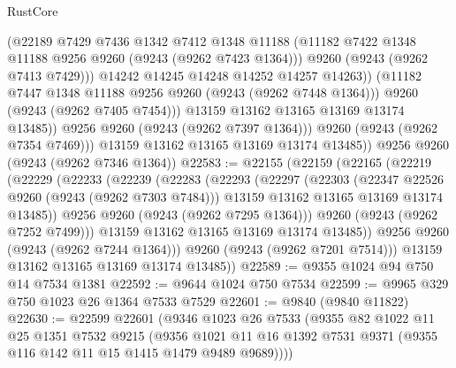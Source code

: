 \begin{lexlean}{RustCore}
\begin{coremodule}
                      (@22189
                        @7429
                        @7436
                        @1342
                        @7412
                        @1348
                        @11188
                        (@11182 @7422 @1348 @11188 @9256 @9260 (@9243 (@9262 @7423 @1364)))
                        @9260
                        (@9243 (@9262 @7413 @7429)))
                      @14242
                      @14245
                      @14248
                      @14252
                      @14257
                      @14263))
                  (@11182 @7447 @1348 @11188 @9256 @9260 (@9243 (@9262 @7448 @1364)))
                  @9260
                  (@9243 (@9262 @7405 @7454)))
                @13159
                @13162
                @13165
                @13169
                @13174
                @13485))
            @9256
            @9260
            (@9243 (@9262 @7397 @1364)))
          @9260
          (@9243 (@9262 @7354 @7469)))
        @13159
        @13162
        @13165
        @13169
        @13174
        @13485))
    @9256
    @9260
    (@9243 (@9262 @7346 @1364))
@22583 := @22155
    (@22159
      (@22165
        (@22219
          (@22229
            (@22233
              (@22239
                (@22283
                  (@22293
                    (@22297
                      (@22303
                        (@22347 @22526 @9260 (@9243 (@9262 @7303 @7484)))
                        @13159
                        @13162
                        @13165
                        @13169
                        @13174
                        @13485))
                    @9256
                    @9260
                    (@9243 (@9262 @7295 @1364)))
                  @9260
                  (@9243 (@9262 @7252 @7499)))
                @13159
                @13162
                @13165
                @13169
                @13174
                @13485))
            @9256
            @9260
            (@9243 (@9262 @7244 @1364)))
          @9260
          (@9243 (@9262 @7201 @7514)))
        @13159
        @13162
        @13165
        @13169
        @13174
        @13485))
@22589 := @9355 @1024 @94 @750 @14 @7534 @1381
@22592 := @9644 @1024 @750 @7534
@22599 := @9965 @329 @750 @1023 @26 @1364 @7533 @7529
@22601 := @9840 (@9840 @11822)
@22630 := @22599
    @22601
    (@9346
      @1023
      @26
      @7533
      (@9355
        @82
        @1022
        @11
        @25
        @1351
        @7532
        @9215
        (@9356 @1021 @11 @16 @1392 @7531 @9371 (@9355 @116 @142 @11 @15 @1415 @1479 @9489 @9689))))

\end{coremodule}
\end{lexlean}
